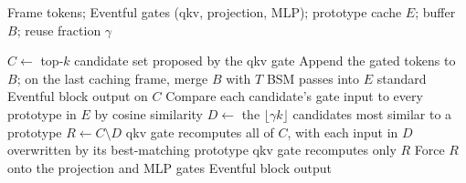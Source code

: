 \begin{algorithm}[t]
\caption{Eventful + TempoMem recompute-set filter (one block, one frame)}
\label{alg:eventfultm}
\begin{algorithmic}[1]
\Require
  Frame tokens; Eventful gates (qkv, projection, MLP);
  prototype cache $E$; buffer $B$; reuse fraction $\gamma$
  \vspace{0.3em}

\State $C \gets$ top-$k$ candidate set proposed by the qkv gate
  \hfill{}
  \State Append the gated tokens to $B$; on the last caching frame,
    merge $B$ with $T$ BSM passes into $E$
  \State \Return standard Eventful block output on $C$
\Else
  \State Compare each candidate's gate input to every prototype in $E$
    by cosine similarity
  \State $D \gets$ the $\lfloor \gamma k \rfloor$ candidates most similar
    to a prototype
    \hfill{}
  \State $R \gets C \setminus D$
    \hfill{}
    \State qkv gate recomputes all of $C$, with each input in $D$
      overwritten by its best-matching prototype
  \Else
    \State qkv gate recomputes only $R$
  \EndIf
  \State Force $R$ onto the projection and MLP gates
    \hfill{}
  \State \Return Eventful block output
\EndIf
\end{algorithmic}
\end{algorithm}
